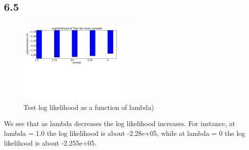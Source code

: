 \documentclass{article}
\begin{document}
\subsection*{6.5}
\begin{figure}[H]
  \caption{Test log likelihood as a function of lambda)}
  \centering
    \includegraphics[width=0.5\textwidth]{q6_p5.pdf}
\end{figure}

We see that as lambda decreases the log likelihood
increases. For instance, at lambda = 1.0 the log likelihood is about -2.28e+05, while at lambda = 0 the log likelihood is about
-2.255e+05.
\end{document}
